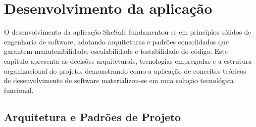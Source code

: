\chapter{Desenvolvimento da aplicação}
O desenvolvimento da aplicação SheSafe fundamentou-se em princípios sólidos de engenharia de software, adotando arquiteturas e padrões consolidados que garantem manutenibilidade, escalabilidade e testabilidade do código. Este capítulo apresenta as decisões arquiteturais, tecnologias empregadas e a estrutura organizacional do projeto, demonstrando como a aplicação de conceitos teóricos de desenvolvimento de software materializou-se em uma solução tecnológica funcional.

\section{Arquitetura e Padrões de Projeto}
